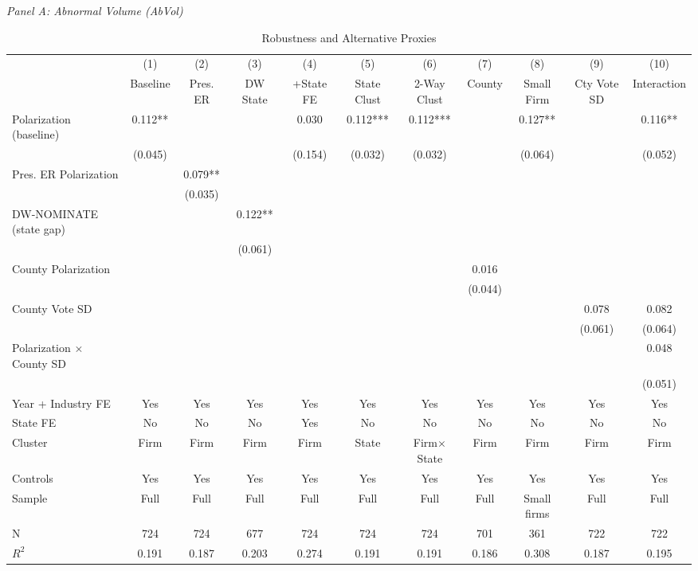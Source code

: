 \begin{table}[htbp]
\centering
\caption{Robustness and Alternative Proxies}
\label{tab:robustness}
\small

\textit{Panel A: Abnormal Volume (AbVol)}
\vspace{2pt}
\begin{tabular}{lcccccccccc}
\toprule
 & (1) & (2) & (3) & (4) & (5) & (6) & (7) & (8) & (9) & (10) \\
 & Baseline & Pres. ER & DW State & +State FE & State Clust & 2-Way Clust & County & Small Firm & Cty Vote SD & Interaction \\
\midrule
Polarization (baseline) & 0.112** &  &  & 0.030 & 0.112*** & 0.112*** &  & 0.127** &  & 0.116** \\
 & (0.045) &  &  & (0.154) & (0.032) & (0.032) &  & (0.064) &  & (0.052) \\
Pres. ER Polarization &  & 0.079** &  &  &  &  &  &  &  &  \\
 &  & (0.035) &  &  &  &  &  &  &  &  \\
DW-NOMINATE (state gap) &  &  & 0.122** &  &  &  &  &  &  &  \\
 &  &  & (0.061) &  &  &  &  &  &  &  \\
County Polarization &  &  &  &  &  &  & 0.016 &  &  &  \\
 &  &  &  &  &  &  & (0.044) &  &  &  \\
County Vote SD &  &  &  &  &  &  &  &  & 0.078 & 0.082 \\
 &  &  &  &  &  &  &  &  & (0.061) & (0.064) \\
Polarization $\times$ County SD &  &  &  &  &  &  &  &  &  & 0.048 \\
 &  &  &  &  &  &  &  &  &  & (0.051) \\
\midrule
Year + Industry FE & Yes & Yes & Yes & Yes & Yes & Yes & Yes & Yes & Yes & Yes \\
State FE & No & No & No & Yes & No & No & No & No & No & No \\
Cluster & Firm & Firm & Firm & Firm & State & Firm$\times$State & Firm & Firm & Firm & Firm \\
Controls & Yes & Yes & Yes & Yes & Yes & Yes & Yes & Yes & Yes & Yes \\
Sample & Full & Full & Full & Full & Full & Full & Full & Small firms & Full & Full \\
N & 724 & 724 & 677 & 724 & 724 & 724 & 701 & 361 & 722 & 722 \\
$R^2$ & 0.191 & 0.187 & 0.203 & 0.274 & 0.191 & 0.191 & 0.186 & 0.308 & 0.187 & 0.195 \\
\bottomrule
\end{tabular}


\end{table}
